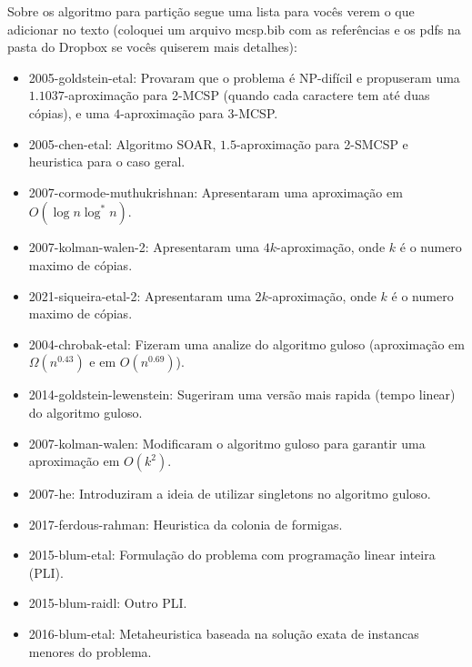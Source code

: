 
{\color{red}
Sobre os algoritmo para partição segue uma lista para vocês verem o que adicionar no texto (coloquei um arquivo mcsp.bib com as referências e os pdfs na pasta do Dropbox se vocês quiserem mais detalhes):
\begin{itemize}
    \item  2005-goldstein-etal\cite{goldstein_minimum_2005}: Provaram que o problema é NP-difícil e propuseram uma \\ $1.1037$-aproximação para 2-MCSP (quando cada caractere tem até duas cópias), e uma $4$-aproximação para 3-MCSP.
    \item 2005-chen-etal\cite{chen_assignment_2005}: Algoritmo SOAR, $1.5$-aproximação para 2-SMCSP e heuristica para o caso geral.
    \item 2007-cormode-muthukrishnan\cite{cormode_string_2007}: Apresentaram uma aproximação em $O(\log n \log^* n)$.
    \item 2007-kolman-walen-2\cite{kolman_reversal_2007}: Apresentaram uma $4k$-aproximação, onde $k$ é o numero maximo de cópias.
    \item 2021-siqueira-etal-2\cite{siqueira_signed_2023}: Apresentaram uma $2k$-aproximação, onde $k$ é o numero maximo de cópias.
    \item 2004-chrobak-etal\cite{chrobak_greedy_2004}: Fizeram uma analize do algoritmo guloso (aproximação em $\Omega(n^{0.43})$ e em $O(n^{0.69})$).
    \item 2014-goldstein-lewenstein\cite{goldstein_quick_2014}: Sugeriram uma versão mais rapida (tempo linear) do algoritmo guloso.
    \item 2007-kolman-walen\cite{kolman_approximating_2007}: Modificaram o algoritmo guloso para garantir uma aproximação em $O(k^2)$.
    \item 2007-he\cite{mandoiu_novel_2007}: Introduziram a ideia de utilizar singletons no algoritmo guloso.
    \item 2017-ferdous-rahman\cite{ferdous_solving_2017}: Heuristica da colonia de formigas.
    \item 2015-blum-etal\cite{blum_mathematical_2015}: Formulação do problema com programação linear inteira (PLI).
    \item 2015-blum-raidl\cite{blum_computational_2016}: Outro PLI.
    \item 2016-blum-etal\cite{blum_construct_2016}: Metaheuristica baseada na solução exata de instancas menores do problema.

\end{itemize}}

